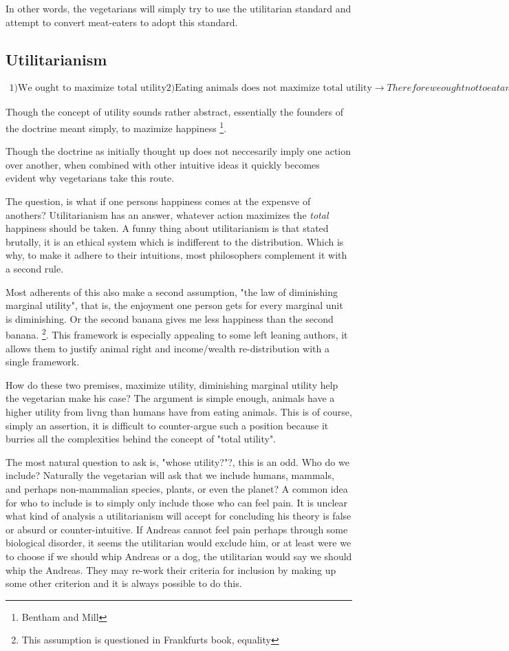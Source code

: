 \documentclass[12pt]{report}
\numberwithin{equation}{section}
\begin{document}
In other words, the vegetarians will simply try to use the utilitarian standard and attempt to convert meat-eaters to adopt this standard. 

\subsection{Utilitarianism} 

\begin{align*}
1) \text{We ought to maximize total utility}
2) \text{Eating animals does not maximize total utility}
\rightarrow Therefore we ought not to eat animals
\end{align*}

Though the concept of utility sounds rather abstract, essentially the founders of the doctrine meant simply, to mazimize happiness \footnote{Bentham and Mill}. 

Though the doctrine as initially thought up does not neccesarily imply one action over another, when combined with other intuitive ideas it quickly becomes evident why vegetarians take this route. 

The question, is what if one persons happiness comes at the expensve of anothers? Utilitarianism has an answer, whatever action maximizes the \textit{total} happiness should be taken. A funny thing about utilitarianism is that stated brutally, it is an ethical system which is indifferent to the distribution. Which is why, to make it adhere to their intuitions, most philosophers complement it with a second rule. 

Most adherents of this also make a second assumption, "the law of diminishing marginal utility", that is, the enjoyment one person gets for every marginal unit is diminishing. Or the second banana gives me less happiness than the second banana. \footnote{This assumption is questioned in Frankfurts book, equality}. This framework is especially appealing to some left leaning authors, it allows them to justify animal right and income/wealth re-distribution with a single framework. 

How do these two premises, maximize utility, diminishing marginal utility help the vegetarian make his case? The argument is simple enough, animals have a higher utility from livng than humans have from eating animals. This is of course, simply an assertion, it is difficult to counter-argue such a position because it burries all the complexities behind the concept of "total utility". 

The most natural question to ask is, "whose utility?"?, this is an odd. Who do we include? Naturally the vegetarian will ask that we include humans, mammals, and perhaps non-mammalian species, plants, or even the planet? A common idea for who to include is to simply only include those who can feel pain. It is unclear what kind of analysis a utilitarianism will accept for concluding his theory is false or absurd or counter-intuitive. If Andreas cannot feel pain perhaps through some biological disorder, it seems the utilitarian would exclude him, or at least were we to choose if we should whip Andreas or a dog, the utilitarian would say we should whip the Andreas.  They may re-work their criteria for inclusion by making up some other criterion and it is always possible to do this. 
\end{document}
